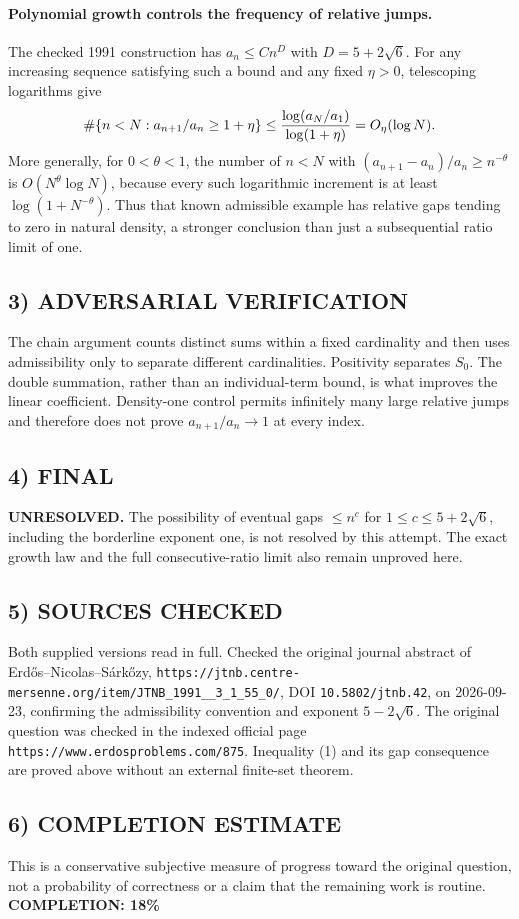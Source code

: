\paragraph{Polynomial growth controls the frequency of relative jumps.}
The checked 1991 construction has $a_n\le Cn^D$ with $D=5+2\sqrt6$. For any increasing sequence satisfying such a bound and any fixed $\eta>0$, telescoping logarithms give
\[
\#\{n<N:a_{n+1}/a_n\ge1+\eta\}
\le {\log(a_N/a_1)\over\log(1+\eta)}=O_\eta(\log N).
\]
More generally, for $0<\theta<1$, the number of $n<N$ with $(a_{n+1}-a_n)/a_n\ge n^{-\theta}$ is $O(N^\theta\log N)$, because every such logarithmic increment is at least $\log(1+N^{-\theta})$. Thus that known admissible example has relative gaps tending to zero in natural density, a stronger conclusion than just a subsequential ratio limit of one.
\subsection{3) ADVERSARIAL VERIFICATION}
The chain argument counts distinct sums within a fixed cardinality and then uses admissibility only to separate different cardinalities. Positivity separates $S_0$. The double summation, rather than an individual-term bound, is what improves the linear coefficient. Density-one control permits infinitely many large relative jumps and therefore does not prove $a_{n+1}/a_n\to1$ at every index.
\subsection{4) FINAL}
\textbf{UNRESOLVED.}
The possibility of eventual gaps $\le n^c$ for $1\le c\le5+2\sqrt6$, including the borderline exponent one, is not resolved by this attempt. The exact growth law and the full consecutive-ratio limit also remain unproved here.
\subsection{5) SOURCES CHECKED}
Both supplied versions read in full. Checked the original journal abstract of Erd\H{o}s--Nicolas--S\'ark\H{o}zy, \texttt{https://jtnb.centre-mersenne.org/item/JTNB\_1991\_\_3\_1\_55\_0/}, DOI \texttt{10.5802/jtnb.42}, on 2026-09-23, confirming the admissibility convention and exponent $5-2\sqrt6$. The original question was checked in the indexed official page \texttt{https://www.erdosproblems.com/875}. Inequality (1) and its gap consequence are proved above without an external finite-set theorem.
\subsection{6) COMPLETION ESTIMATE}
This is a conservative subjective measure of progress toward the original question, not a probability of correctness or a claim that the remaining work is routine.
\textbf{COMPLETION: 18\%}
